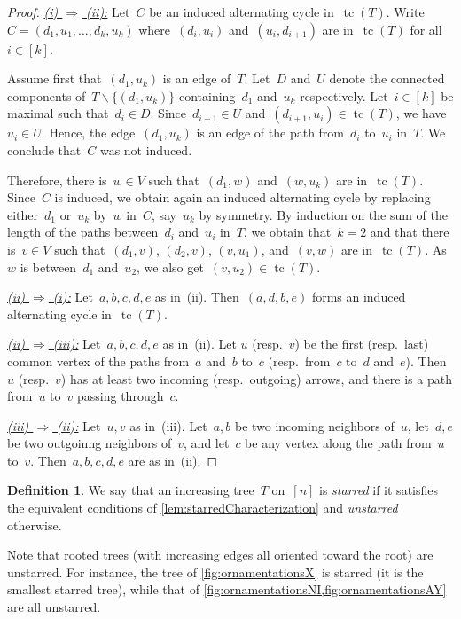 \documentclass{amsart}
\theoremstyle{definition}
\newtheorem{definition}[theorem]{Definition}
\newcommand{\ssm}{\smallsetminus} %
\DeclareMathOperator{\tc}{tc} %
\newcommand{\darkblue}{\color{darkblue}} %
\newcommand{\defn}[1]{\textsl{\darkblue #1}} %
\begin{document}
\begin{proof}
\uline{\textsl{(i) $\Rightarrow$ (ii):}}
Let~$C$ be an induced alternating cycle in~$\tc(T)$.
Write~$C = (d_1, u_1, \dots, d_k, u_k)$ where~$(d_i, u_i)$ and~$(u_i, d_{i+1})$ are in~$\tc(T)$ for all~$i \in [k]$.

Assume first that~$(d_1,u_k)$ is an edge of~$T$.
Let~$D$ and~$U$ denote the connected components of~$T \ssm \{(d_1,u_k)\}$ containing~$d_1$ and~$u_k$ respectively.
Let~$i \in [k]$ be maximal such that~$d_i \in D$.
Since~$d_{i+1} \in U$ and~$(d_{i+1}, u_i) \in \tc(T)$, we have~$u_i \in U$.
Hence, the edge~$(d_1,u_k)$ is an edge of the path from~$d_i$ to~$u_i$ in~$T$.
We conclude that~$C$ was not induced.

Therefore, there is~$w \in V$ such that~$(d_1,w)$ and~$(w,u_k)$ are in~$\tc(T)$.
Since~$C$ is induced, we obtain again an induced alternating cycle by replacing either~$d_1$ or~$u_k$ by~$w$ in~$C$, say~$u_k$ by symmetry.
By induction on the sum of the length of the paths between~$d_i$ and~$u_i$ in~$T$, we obtain that~$k = 2$ and that there is~$v \in V$ such that~$(d_1, v)$, $(d_2,v)$, $(v,u_1)$, and~$(v,w)$ are in~$\tc(T)$.
As~$w$ is between~$d_1$ and~$u_2$, we also get~$(v,u_2) \in \tc(T)$.

\medskip\noindent
\uline{\textsl{(ii) $\Rightarrow$ (i):}} Let~$a,b,c,d,e$ as in~(ii). Then~$(a,d,b,e)$ forms an induced alternating cycle in~$\tc(T)$.

\medskip\noindent
\uline{\textsl{(ii) $\Rightarrow$ (iii):}} Let~$a,b,c,d,e$ as in~(ii). Let $u$ (resp.~$v$) be the first (resp.~last) common vertex of the paths from~$a$ and~$b$ to~$c$ (resp.~from~$c$ to~$d$ and~$e$). Then~$u$ (resp.~$v$) has at least two incoming (resp.~outgoing) arrows, and there is a path from~$u$ to~$v$ passing through~$c$.

\medskip\noindent
\uline{\textsl{(iii) $\Rightarrow$ (ii):}} Let~$u,v$ as in~(iii). Let~$a,b$ be two incoming neighbors of~$u$, let~$d,e$ be two outgoinng neighbors of~$v$, and let~$c$ be any vertex along the path from~$u$ to~$v$. Then~$a,b,c,d,e$ are as in~(ii).
\end{proof}

\begin{definition}
\label{def:starredTree}
We say that an increasing tree~$T$ on~$[n]$ is \defn{starred} if it satisfies the equivalent conditions of \cref{lem:starredCharacterization} and \defn{unstarred} otherwise.
\end{definition}

Note that rooted trees (with increasing edges all oriented toward the root) are unstarred.
For instance, the tree of \cref{fig:ornamentationsX} is starred (it is the smallest starred tree), while that of \cref{fig:ornamentationsNI,fig:ornamentationsAY} are all unstarred.
\end{document}

